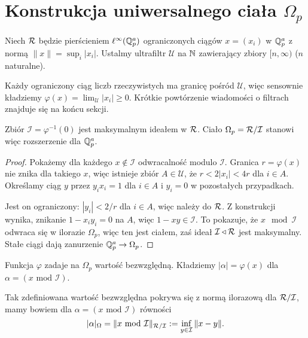 \section{Konstrukcja uniwersalnego ciała $\Omega_p$}
Niech  $\mathcal R$ będzie pierścieniem $\ell^\infty(\mathbb Q_p^a)$ ograniczonych ciągów $x = (x_i)$ w $\mathbb Q_p^a$ z normą $\|x\| = \sup_i |x_i|$. 
Ustalmy ultrafiltr $\mathcal U$ na $\mathbb N$ zawierający zbiory $[n, \infty)$ ($n$ naturalne).

Każdy ograniczony ciąg liczb rzeczywistych ma granicę pośród $\mathcal U$, więc sensownie kładziemy $\varphi(x) = \lim_{\mathcal U} |x_i| \ge 0$.
Krótkie powtórzenie wiadomości o filtrach znajduje się na końcu sekcji.

\begin{fakt}
	Zbiór $\mathcal I = \varphi^{-1}(0)$ jest maksymalnym ideałem w $\mathcal R$.
	Ciało $\Omega_p = \mathcal R / \mathcal I$ stanowi więc rozszerzenie dla $\mathbb Q_p^a$.
\end{fakt}

\begin{proof}
	Pokażemy dla każdego $x \not \in \mathcal I$ odwracalność modulo $\mathcal I$.
	Granica $r = \varphi(x)$ nie znika dla takiego $x$, więc istnieje zbiór $A \in \mathcal U$, że $r < 2 |x_i| < 4r$ dla $i \in A$.
	Określamy ciąg $y$ przez $y_i x_i = 1$ dla $i \in A$ i $y_i = 0$ w pozostałych przypadkach.

	Jest on ograniczony: $|y_i| < 2 / r$ dla $i \in A$, więc należy do $\mathcal R$.
	Z konstrukcji wynika, znikanie $1 - x_iy_i = 0$ na $A$, więc $1 - xy \in \mathcal I$.
	To pokazuje, że $x \mod \mathcal I$ odwraca się w ilorazie $\Omega_p$, więc ten jest ciałem, zaś ideał $\mathcal I \triangleleft \mathcal R$ jest maksymalny.
	Stałe ciągi dają zanurzenie $\mathbb Q_p^a \to \Omega_p$.
\end{proof}

Funkcja $\varphi$ zadaje na $\Omega_p$ wartość bezwzględną.
Kładziemy $|\alpha| = \varphi(x)$ dla $\alpha = (x \mbox{ mod } \mathcal I)$.

\begin{fakt}
	Tak zdefiniowana wartość bezwzględna pokrywa się z normą ilorazową dla $\mathcal R / \mathcal I$, mamy bowiem dla $\alpha = (x \mbox { mod } \mathcal I)$ równości
	\[
		|\alpha|_\Omega = \|x \mbox{ mod }\mathcal I\|_{\mathcal R / \mathcal I} := \inf_{y \in \mathcal I} \|x - y\|.
	\]
\end{fakt}

